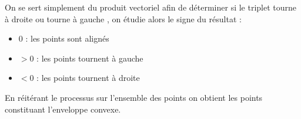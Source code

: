 On se sert simplement du produit vectoriel afin de déterminer si le triplet \og tourne à droite \fg{} ou \og tourne à gauche \fg{}, on étudie alors le signe du résultat :
\begin{itemize}
\item $0$ : les points sont alignés
\item $>0$ : les points \og tournent à gauche \fg{}
\item $<0$ : les points \og tournent à droite \fg{}
\end{itemize}
En réitérant le processus sur l'ensemble des points on obtient les points constituant l'enveloppe convexe.